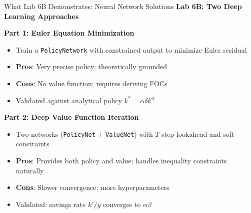 \documentclass[10pt,english,aspectratio=169]{beamer}
\begin{document}
\begin{frame}{What Lab 6B Demonstrates: Neural Network Solutions}
\textbf{Lab 6B: Two Deep Learning Approaches}

\vspace{0.2cm}
\textbf{Part 1: Euler Equation Minimization}
\begin{itemize}
  \item Train a \texttt{PolicyNetwork} with constrained output to minimize Euler residual
  \item \textbf{Pros}: Very precise policy; theoretically grounded
  \item \textbf{Cons}: No value function; requires deriving FOCs
  \item Validated against analytical policy $k^* = \alpha\delta k^\alpha$
\end{itemize}

\vspace{0.2cm}
\textbf{Part 2: Deep Value Function Iteration}
\begin{itemize}
  \item Two networks (\texttt{PolicyNet} + \texttt{ValueNet}) with $T$-step lookahead and soft constraints
  \item \textbf{Pros}: Provides both policy and value; handles inequality constraints naturally
  \item \textbf{Cons}: Slower convergence; more hyperparameters
  \item Validated: savings rate $k'/y$ converges to $\alpha\beta$
\end{itemize}
\end{frame}
\end{document}
